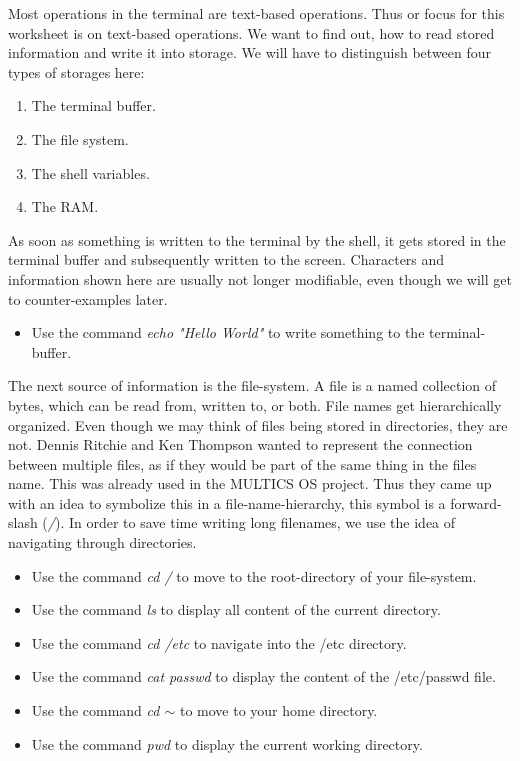 \documentclass{dcbl/challenge}
\begin{document}
\begin{aufgabe}
    Most operations in the terminal are text-based operations. 
    Thus or focus for this worksheet is on text-based operations.
    We want to find out, how to read stored information and write it into storage. 
    We will have to distinguish between four types of storages here:
    \begin{enumerate}
        \item The terminal buffer.
        \item The file system.
        \item The shell variables.
        \item The RAM.
    \end{enumerate}
    As soon as something is written to the terminal by the shell, it gets stored in the terminal buffer and subsequently written to the screen. 
    Characters and information shown here are usually not longer modifiable, even though we will get to counter-examples later.
    \begin{itemize}
        \item Use the command \textit{echo "Hello World"} to write something to the terminal-buffer.
    \end{itemize}
    
\end{aufgabe}
\begin{aufgabe}
    The next source of information is the file-system. 
    A file is a named collection of bytes, which can be read from, written to, or both. 
    File names get hierarchically organized. 
    Even though we may think of files being stored in directories, they are not.
    Dennis Ritchie and Ken Thompson wanted to represent the connection between multiple files, as if they would be part of the same thing in the files name. 
    This was already used in the MULTICS OS project.
    Thus they came up with an idea to symbolize this in a file-name-hierarchy, this symbol is a forward-slash (\textit{/}).
    In order to save time writing long filenames, we use the idea of navigating through directories.
    \begin{itemize}
        \item Use the command \textit{cd /} to move to the root-directory of your file-system.
        \item Use the command \textit{ls} to display all content of the current directory.
        \item Use the command \textit{cd /etc} to navigate into the /etc directory.
        \item Use the command \textit{cat passwd} to display the content of the /etc/passwd file.
        \item Use the command \textit{cd $\sim$} to move to your home directory.
        \item Use the command \textit{pwd} to display the current working directory.
    \end{itemize}

\end{aufgabe}
\end{document}
